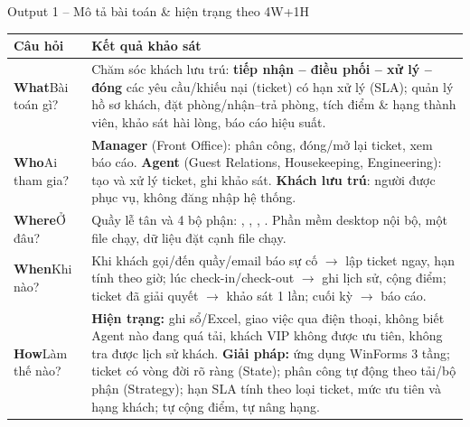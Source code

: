 \begin{frame}{Output 1 -- Mô tả bài toán \& hiện trạng theo 4W+1H}
\scriptsize
\begin{tabularx}{\textwidth}{@{}L{1.75cm}Y@{}}
\toprule
\textbf{Câu hỏi} & \textbf{Kết quả khảo sát} \\
\midrule
\textbf{What}\newline Bài toán gì? & Chăm sóc khách lưu trú: \textbf{tiếp nhận -- điều phối -- xử lý -- đóng} các yêu cầu/khiếu nại (ticket) có hạn xử lý (SLA); quản lý hồ sơ khách, đặt phòng/nhận--trả phòng, tích điểm \& hạng thành viên, khảo sát hài lòng, báo cáo hiệu suất. \\
\textbf{Who}\newline Ai tham gia? & \textbf{Manager} (Front Office): phân công, đóng/mở lại ticket, xem báo cáo. \textbf{Agent} (Guest Relations, Housekeeping, Engineering): tạo và xử lý ticket, ghi khảo sát. \textbf{Khách lưu trú}: người được phục vụ, không đăng nhập hệ thống. \\
\textbf{Where}\newline Ở đâu? & Quầy lễ tân và 4 bộ phận: , , , . Phần mềm desktop nội bộ, một file chạy, dữ liệu đặt cạnh file chạy. \\
\textbf{When}\newline Khi nào? & Khi khách gọi/đến quầy/email báo sự cố $\to$ lập ticket ngay, hạn tính theo giờ; lúc check-in/check-out $\to$ ghi lịch sử, cộng điểm; ticket đã giải quyết $\to$ khảo sát 1 lần; cuối kỳ $\to$ báo cáo. \\
\textbf{How}\newline Làm thế nào? & \textbf{Hiện trạng:} ghi sổ/Excel, giao việc qua điện thoại, không biết Agent nào đang quá tải, khách VIP không được ưu tiên, không tra được lịch sử khách. \newline
\textbf{Giải pháp:} ứng dụng WinForms 3 tầng; ticket có vòng đời rõ ràng (State); phân công tự động theo tải/bộ phận (Strategy); hạn SLA tính theo loại ticket, mức ưu tiên và hạng khách; tự cộng điểm, tự nâng hạng. \\
\bottomrule
\end{tabularx}
\end{frame}

